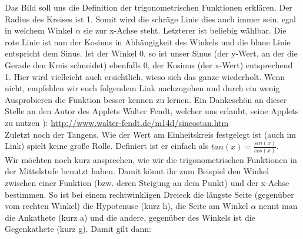 			Das Bild soll uns die Definition der trigonometrischen Funktionen erklären.
			Der Radius des Kreises ist 1. Somit wird die schräge Linie dies auch immer
			sein, egal in welchem Winkel \(\alpha\) sie zur x-Achse steht. Letzterer ist
			beliebig wählbar. Die rote Linie ist nun der Kosinus in Abhängigkeit des
			Winkels und die blaue Linie entspricht dem Sinus. Ist der Winkel 0, so ist
			unser Sinus (der y-Wert, an der die Gerade den Kreis schneidet) ebenfalls 0,
			der Kosinus (der x-Wert) entsprechend 1. Hier wird vielleicht auch
			ersichtlich, wieso sich das ganze wiederholt. Wenn nicht, empfehlen wir euch
			folgendem Link nachzugehen und durch ein wenig Ausprobieren die Funktion
			besser kennen zu lernen. Ein Dankeschön an dieser Stelle an den Autor des
			Applets Walter Fendt, welcher uns erlaubt, seine Applets zu nutzen ):
			\url{http://www.walter-fendt.de/m14d/sincostan.htm}\\
			Zuletzt noch der Tangens. Wie der Wert am Einheitskreis festgelegt ist (auch
			im Link) spielt keine große Rolle. Definiert ist er einfach als
			\(tan(x)=\frac{sin(x)}{cos(x)}\).\\
			Wir möchten noch kurz ansprechen, wie wir die trigonometrischen Funktionen in
			der Mittelstufe benutzt haben. Damit könnt ihr zum Beispiel den Winkel
			zwischen einer Funktion (bzw. deren Steigung an dem Punkt) und der x-Achse
			bestimmen. So ist bei einem rechtwinkligen Dreieck die längste Seite
			(gegenüber vom rechten Winkel) die Hypotenuse (kurz h), die Seite am Winkel
			\(\alpha\) nennt man die Ankathete (kurz a) und die andere, gegenüber des
			Winkels ist die Gegenkathete (kurz g). Damit gilt dann:
			\formel{\[sin(\alpha)=\frac{g}{h},\ cos(\alpha)=\frac{a}{h},\
			tan(\alpha)=\frac{g}{a}\]}
